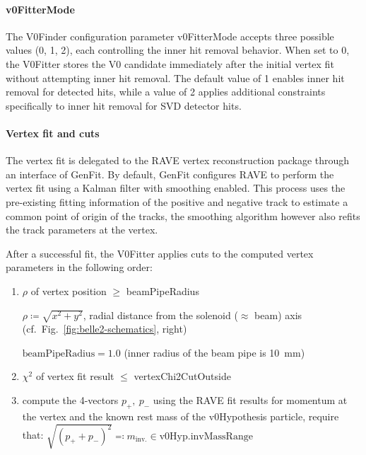 \paragraph{v0FitterMode \cite{v0finding-basf2}}\label{par:v0fittermode}
The V0Finder configuration parameter v0FitterMode accepts three possible values (0, 1, 2), each controlling the inner hit removal behavior. 
When set to 0, the V0Fitter stores the V0 candidate immediately after the initial vertex fit without attempting inner hit removal. 
The default value of 1 enables inner hit removal for detected hits, while a value of 2 applies additional constraints specifically to inner hit removal for SVD detector hits.

\paragraph{Vertex fit and cuts}\label{par:vertex-cuts}
The vertex fit is delegated to the RAVE \cite{rave} vertex reconstruction package through an interface of GenFit. 
By default, GenFit configures RAVE to perform the vertex fit using a Kalman filter with smoothing enabled. 
This process uses the pre-existing fitting information of the positive and negative track to estimate a common point of origin of the tracks, the smoothing algorithm however also refits the track parameters at the vertex.

After a successful fit, the V0Fitter applies cuts to the computed vertex parameters in the following order:
\begin{enumerate}[parsep=3pt, topsep=0pt, itemsep = 5pt]
  \item $\rho$ of vertex position $\geq$ beamPipeRadius\par%
  $\rho \coloneq \sqrt{x^2 + y^2}$, radial distance from the solenoid ($\approx$ beam) axis (cf.\ Fig.\ \ref{fig:belle2-schematics}, right)\par%
  $\text{beamPipeRadius} = 1.0$ (inner radius of the beam pipe is \qty{10}{\milli\meter})
  \item $\chi^2$ of vertex fit result $\leq$ vertexChi2CutOutside
  \item compute the 4-vectors $p_+,\ p_-$ using the RAVE fit results for momentum at the vertex and the known rest mass of the v0Hypothesis particle, require that:
        $\sqrt{\left(p_+ + p_-\right)^2} \eqcolon m_\text{inv.} \in \text{v0Hyp.invMassRange}$
\end{enumerate}
